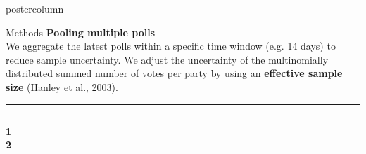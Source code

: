 \documentclass[final,hyperref={pdfpagelabels=false}]{beamer}
\newcommand{\bfBlue}[1]{\textcolor{koaladarkestblue}{\textbf{#1}}}
\newcommand{\darkgray}[1]{\textcolor{koaladarkgray}{#1}}
\begin{document}
\begin{frame}
\begin{columns}
\begin{column}{1\textwidth}
\begin{columns}[T]
\begin{column}{.484\textwidth}
\begin{beamercolorbox}[center,wd=\textwidth]{postercolumn}
\begin{minipage}[T]{.95\textwidth}
\begin{block}{\footnotesize Methods}
\bfBlue{Pooling multiple polls} \\[0.5cm]
We aggregate the latest polls within a specific time window 
(e.g. 14 days) to reduce
sample uncertainty. We adjust the uncertainty of the multinomially distributed
summed number of votes per party by using an \darkgray{\textbf{effective sample size}} {\footnotesize (Hanley et al., 2003)}.
\\[0.05cm]
\textcolor{LMUlightgray}{\hrule{}}
\vspace{1ex}
\hspace*{-40px}
\begin{minipage}{\textwidth}
\begin{columns}[t]
  \begin{column}{.01\textwidth}
  \vspace{7px}
  \begin{minipage}{\textwidth}
  \bfBlue{1} \\
  \vspace{284px}
  \bfBlue{2}
  \end{minipage}
  \end{column}

  \hspace{-30px}
  \textcolor{LMUlightgray}{\vrule{}}
  \hspace{0px}


\end{columns}
\end{minipage}
\end{block}
\end{minipage}
\end{beamercolorbox}
\end{column}
\end{columns}
\end{column}
\end{columns}
\end{frame}
\end{document}
